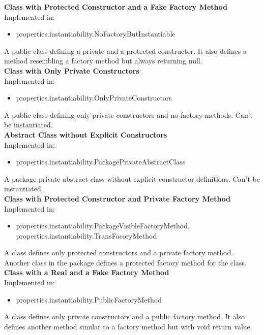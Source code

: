 \documentclass{article}
\begin{document}
\noindent
\textbf{Class with Protected Constructor and a Fake Factory Method}\\
Implemented in: 
\begin{itemize}
    \item properties.instantiability.NoFactoryButInstantiable
\end{itemize}
A public class defining a private and a protected constructor. It also defines a method resembling a factory method but always returning null.\\

\noindent
\textbf{Class with Only Private Constructors}\\
Implemented in: 
\begin{itemize}
    \item properties.instantiability.OnlyPrivateConstructors
\end{itemize}
A public class defining only private constructors and no factory methods. Can't be instantiated.\\

\noindent
\textbf{Abstract Class without Explicit Constructors}\\
Implemented in: 
\begin{itemize}
    \item properties.instantiability.PackagePrivateAbstractClass
\end{itemize}
A package private abstract class without explicit constructor definitions. Can't be instantiated.\\

\noindent
\textbf{Class with Protected Constructor and Private Factory Method}\\
Implemented in: 
\begin{itemize}
    \item properties.instantiability.PackageVisibleFactoryMethod, properties.instantiability.TransFacoryMethod
\end{itemize}
A class defines only protected constructors and a private factory method. Another class in the package defines a protected factory method for the class.\\

\noindent
\textbf{Class with a Real and a Fake Factory Method}\\
Implemented in: 
\begin{itemize}
    \item properties.instantiability.PublicFactoryMethod
\end{itemize}
A class defines only private constructors and a public factory method. It also defines another method similar to a factory method but with void return value.\\
\end{document}
